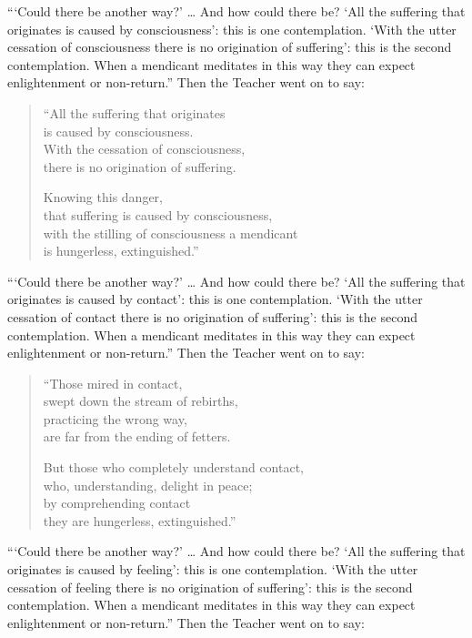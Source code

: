 \documentclass[12pt,openany]{book}%
\begin{document}
“‘Could there be another way?’ … And how could there be? ‘All the suffering that originates is caused by consciousness’: this is one contemplation. ‘With the utter cessation of consciousness there is no origination of suffering’: this is the second contemplation. When a mendicant meditates in this way they can expect enlightenment or non-return.” Then the Teacher went on to say: 

\begin{verse}%
“All the suffering that originates \\
is caused by consciousness. \\
With the cessation of consciousness, \\
there is no origination of suffering. 

Knowing this danger, \\
that suffering is caused by consciousness, \\
with the stilling of consciousness a mendicant \\
is hungerless, extinguished.” 

%
\end{verse}

“‘Could there be another way?’ … And how could there be? ‘All the suffering that originates is caused by contact’: this is one contemplation. ‘With the utter cessation of contact there is no origination of suffering’: this is the second contemplation. When a mendicant meditates in this way they can expect enlightenment or non-return.” Then the Teacher went on to say: 

\begin{verse}%
“Those mired in contact, \\
swept down the stream of rebirths, \\
practicing the wrong way, \\
are far from the ending of fetters. 

But those who completely understand contact, \\
who, understanding, delight in peace; \\
by comprehending contact \\
they are hungerless, extinguished.” 

%
\end{verse}

“‘Could there be another way?’ … And how could there be? ‘All the suffering that originates is caused by feeling’: this is one contemplation. ‘With the utter cessation of feeling there is no origination of suffering’: this is the second contemplation. When a mendicant meditates in this way they can expect enlightenment or non-return.” Then the Teacher went on to say: 
\end{document}

